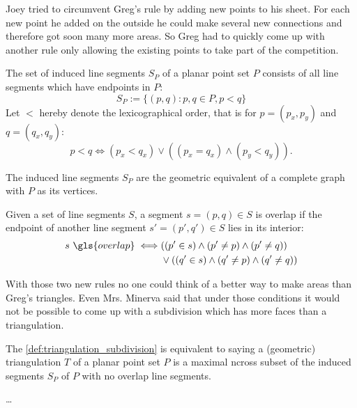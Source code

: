 Joey tried to circumvent Greg's rule by adding new points to his
sheet. For each new point he added on the outside he could make
several new connections and therefore got soon many more areas. So
Greg had to quickly come up with another rule only allowing the
existing points to take part of the competition.

\begin{definition}\label{def:induced_segments}
  The set of induced line segments \(S_P\) of a planar point set \(P\)
  consists of all line segments which have endpoints in \(P\):
  \[
    S_P := \{(p,q) : p,q\in P, p < q\}
  \]
  Let \(<\) hereby denote the lexicographical order, that is for
  \(p = (p_x,p_y)\) and \(q = (q_x,q_y)\):
  \[
    p < q \iff (p_x < q_x) \lor ((p_x = q_x) \land (p_y < q_y)).
  \]
  
  The induced line segments \(S_P\) are the geometric equivalent
  of a complete graph with \(P\) as its vertices.
\end{definition}

\begin{definition}\label{def:overlapping_segments}
  Given a set of line segments \(S\), a segment \(s = (p,q) \in S\) is 
  \gls{overlap} if the endpoint of another line segment
  \(s' = (p', q') \in S\) lies in its interior:
  \begin{alignat*}{1}
    s~\gls{overlap} \iff 
    & ((p' \in s) \land (p' \not= p)\land (p' \not= q)) \\
    &\lor ((q' \in s) \land (q' \not= p) \land (q' \not= q))
  \end{alignat*}
\end{definition}

With those two new rules no one could think of a better way to make
areas than Greg's triangles. Even Mrs. Minerva said that under those
conditions it would not be possible to come up with a subdivision
which has more faces than a triangulation.

\begin{definition}\label{def:triangulation}
  The \cref{def:triangulation_subdivision} is equivalent to saying
  a (geometric) triangulation \(T\) of a planar point set \(P\) is a 
  maximal \gls{ncross} subset of the induced segments \(S_P\) of
  \(P\) with no \gls{overlap} line segments.
\end{definition}

\begin{definition}
  \label{def:constrained_triangulation}
  \ldots{}
\end{definition}

